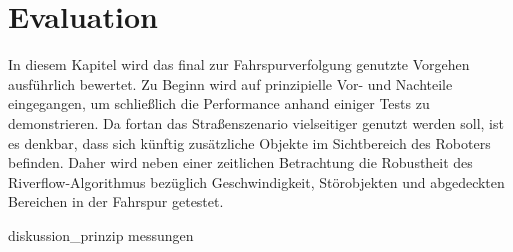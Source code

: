 \chapter{Evaluation \dcfirstauthorshort}
\label{cha:evaluation}

In diesem Kapitel wird das final zur Fahrspurverfolgung genutzte Vorgehen ausführlich bewertet. Zu Beginn wird auf prinzipielle Vor- und Nachteile eingegangen, um schließlich die Performance anhand einiger Tests zu demonstrieren. Da fortan das Straßenszenario vielseitiger genutzt werden soll, ist es denkbar, dass sich künftig zusätzliche Objekte im Sichtbereich des Roboters befinden. Daher wird neben einer zeitlichen Betrachtung die Robustheit des Riverflow-Algorithmus bezüglich Geschwindigkeit, Störobjekten und abgedeckten Bereichen in der Fahrspur getestet.

{diskussion_prinzip}
{messungen}


